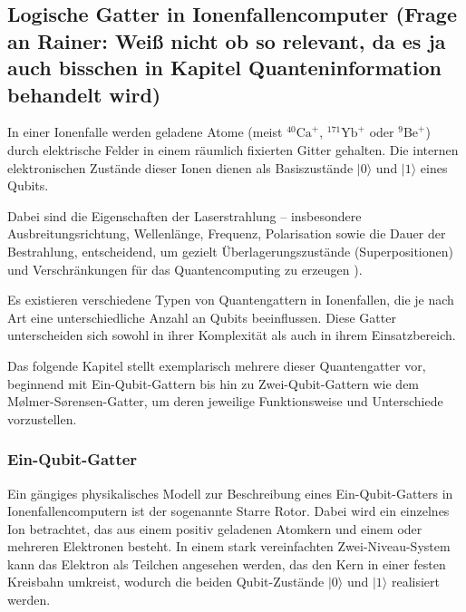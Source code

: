 \subsection{Logische Gatter in Ionenfallencomputer (Frage an Rainer: Weiß nicht ob so relevant, da es ja auch bisschen in Kapitel Quanteninformation behandelt wird)}

In einer Ionenfalle werden geladene Atome (meist \( ^{40}\mathrm{Ca}^+ \), \( ^{171}\mathrm{Yb}^+ \) oder \( ^{9}\mathrm{Be}^+ \)) durch elektrische Felder in einem räumlich fixierten Gitter gehalten. Die internen elektronischen Zustände dieser Ionen dienen als Basiszustände \( \lvert 0 \rangle \) und \( \lvert 1 \rangle \) eines Qubits. 

Dabei sind die Eigenschaften der Laserstrahlung – insbesondere Ausbreitungsrichtung, Wellenlänge, Frequenz, Polarisation sowie die Dauer der Bestrahlung, entscheidend, um gezielt Überlagerungszustände (Superpositionen) und Verschränkungen für das Quantencomputing zu erzeugen \cite{baumann_ionenfallen-quantencomputer_2024}). 

Es existieren verschiedene Typen von Quantengattern in Ionenfallen, die je nach Art eine unterschiedliche Anzahl an Qubits beeinflussen. Diese Gatter unterscheiden sich sowohl in ihrer Komplexität als auch in ihrem Einsatzbereich.

Das folgende Kapitel stellt exemplarisch mehrere dieser Quantengatter vor, beginnend mit Ein-Qubit-Gattern bis hin zu Zwei-Qubit-Gattern wie dem Mølmer-Sørensen-Gatter, um deren jeweilige Funktionsweise und Unterschiede vorzustellen.

\subsubsection{Ein-Qubit-Gatter}

Ein gängiges physikalisches Modell zur Beschreibung eines Ein-Qubit-Gatters in Ionenfallencomputern ist der sogenannte \glqq Starre Rotor\grqq. Dabei wird ein einzelnes Ion betrachtet, das aus einem positiv geladenen Atomkern und einem oder mehreren Elektronen besteht. In einem stark vereinfachten Zwei-Niveau-System kann das Elektron als Teilchen angesehen werden, das den Kern in einer festen Kreisbahn umkreist, wodurch die beiden Qubit-Zustände \( \lvert 0 \rangle \) und \( \lvert 1 \rangle \) realisiert werden.

